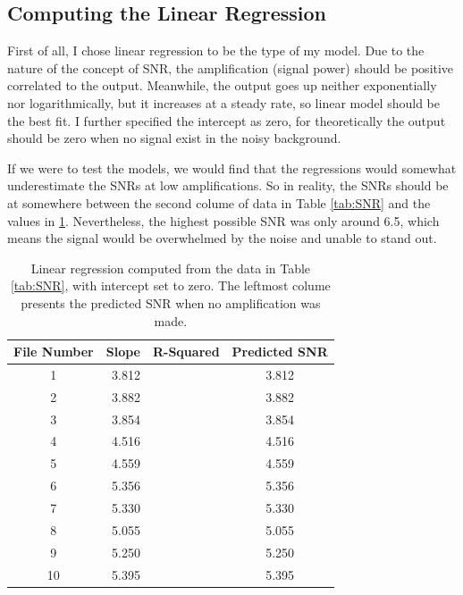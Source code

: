\documentclass[aps,prd,preprint]{revtex4}
\begin{document}
\subsection{Computing the Linear Regression}
First of all, I chose linear regression to be the type of my model. Due to the nature of the concept of SNR, the amplification (signal power) should be positive correlated to the output. Meanwhile, the output goes up neither exponentially nor logarithmically, but it increases at a steady rate, so linear model should be the best fit. I further specified the intercept as zero, for theoretically the output should be zero when no signal exist in the noisy background.
\par If we were to test the models, we would find that the regressions would somewhat underestimate the SNRs at low amplifications. So in reality, the SNRs should be at somewhere between the second colume of data in Table \ref{tab:SNR} and the values in \ref{tab:predict}. Nevertheless, the highest possible SNR was only around 6.5, which means the signal would be overwhelmed by the noise and unable to stand out.
\begin{table}
	\caption{Linear regression computed from the data in Table \ref{tab:SNR}, with intercept set to zero. The leftmost colume presents the predicted SNR when no amplification was made. \label{tab:predict}}
	\begin{tabular}{crrc}
		\hline
		\hline
		File Number & Slope & R-Squared & Predicted SNR \\
		\hline
		1 & 3.812  &  & 3.812  \\
		
		2 & 3.882  &  & 3.882  \\
		
		3 & 3.854  &  & 3.854  \\
		
		4 & 4.516  &  & 4.516  \\
		
		5 & 4.559  &  & 4.559  \\
		
		6 & 5.356  &  & 5.356  \\
		
		7 & 5.330  &  & 5.330  \\
		
		8 & 5.055  &  & 5.055  \\
		
		9 & 5.250  &  & 5.250  \\
		
		10 & 5.395  &  & 5.395  \\
		\hline
		\hline
	\end{tabular}  
\end{table}
\end{document}
